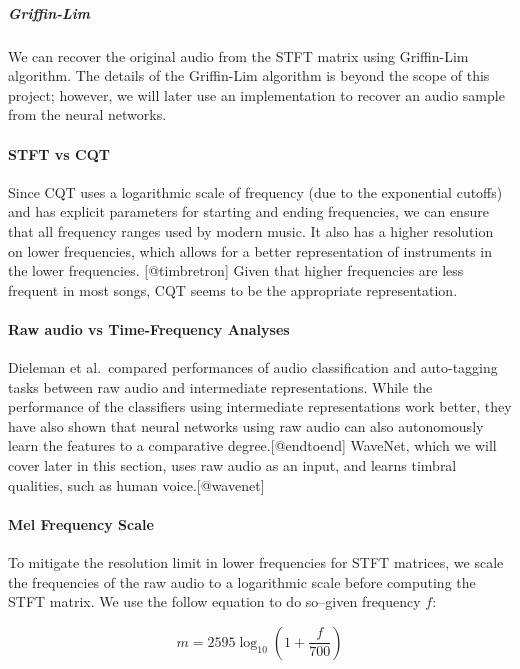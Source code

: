 \documentclass[12pt,a4paper,]{report}
\begin{document}
\subparagraph{Griffin-Lim}

We can recover the original audio from the STFT matrix using Griffin-Lim
algorithm. The details of the Griffin-Lim algorithm is beyond the scope
of this project; however, we will later use an implementation to recover
an audio sample from the neural networks.

\paragraph{STFT vs CQT}

Since CQT uses a logarithmic scale of frequency (due to the exponential
cutoffs) and has explicit parameters for starting and ending
frequencies, we can ensure that all frequency ranges used by modern
music. It also has a higher resolution on lower frequencies, which
allows for a better representation of instruments in the lower
frequencies. {[}@timbretron{]} Given that higher frequencies are less
frequent in most songs, CQT seems to be the appropriate representation.

\paragraph{Raw audio vs Time-Frequency Analyses}

Dieleman et al.~compared performances of audio classification and
auto-tagging tasks between raw audio and intermediate representations.
While the performance of the classifiers using intermediate
representations work better, they have also shown that neural networks
using raw audio can also autonomously learn the features to a
comparative degree.{[}@endtoend{]} WaveNet, which we will cover later in
this section, uses raw audio as an input, and learns timbral qualities,
such as human voice.{[}@wavenet{]}

\paragraph{Mel Frequency Scale}

To mitigate the resolution limit in lower frequencies for STFT matrices,
we scale the frequencies of the raw audio to a logarithmic scale before
computing the STFT matrix. We use the follow equation to do so--given
frequency \(f\):

\begin{equation}
    m = 2595 \log_{10} (1 + \frac{f}{700})
\end{equation}
\end{document}

